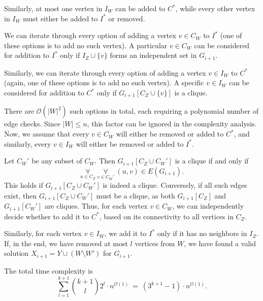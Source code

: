 \documentclass[12pt]{article}
\begin{document}
	\medskip
	
	Similarly, at most one vertex in \(I_{W}\) can be added to \(C^{\ast}\),
	while every other vertex in \(I_{W}\) must either be added to \(I^{\ast}\)
	or removed.
	
	\medskip
	
	We can iterate through every option of adding a vertex \(v \in C_{W}\) to
	\(I^{\ast}\) (one of these options is to add no such vertex). A particular
	\(v \in C_{W}\) can be considered for addition to \(I^{\ast}\) only if
	\(I_{Z} \cup \{v\}\) forms an independent set in \(G_{i + 1}\).
	
	\medskip
	
	Similarly, we can iterate through every option of adding a vertex \(v \in
	I_{W}\) to \(C^{\ast}\) (again, one of these options is to add no such
	vertex). A specific \(v \in I_{W}\) can be considered for addition to
	\(C^{\ast}\) only if \(G_{i + 1}[C_{Z} \cup \{v\}]\) is a clique.
	
	\medskip
	
	There are \(\mathcal{O}(|W|^{2})\) such options in total, each requiring a
	polynomial number of edge checks. Since \(|W| \leqslant n\), this factor can
	be ignored in the complexity analysis. Now, we assume that every \(v \in
	C_{W}\) will either be removed or added to \(C^{\ast}\), and similarly,
	every \(v \in I_{W}\) will either be removed or added to \(I^{\ast}\).
	
	\medskip
	
	Let \(C_{W}'\) be any subset of \(C_{W}\). Then \(G_{i + 1}[C_{Z} \cup
	C_{W}']\) is a clique if and only if
	\[ \underset{u \in C_{Z}}{\forall} \ \underset{v \in C_{W}'}{\forall} \
	(u, v) \in E(G_{i + 1}) \text{.} \]
	This holds if \(G_{i + 1}[C_{Z} \cup C_{W}']\) is indeed a clique.
	Conversely, if all such edges exist, then \(G_{i + 1}[C_{Z} \cup C_{W}']\)
	must be a clique, as both \(G_{i + 1}[C_{Z}]\) and \(G_{i + 1}[C_{W}']\) are
	cliques. Thus, for each vertex \(v \in C_{W}\), we can independently decide
	whether to add it to \(C^{\ast}\), based on its connectivity to all vertices
	in \(C_{Z}\).
	
	\medskip
	
	Similarly, for each vertex \(v \in I_{W}\), we add it to \(I^{\ast}\) only
	if it has no neighbors in \(I_{Z}\). If, in the end, we have removed at most
	\(l\) vertices from \(W\), we have found a valid solution \(X_{i + 1} = Y
	\cup (W \setminus W')\) for \(G_{i + 1}\).
	
	\medskip
	
	The total time complexity is
	\[ \sum_{l = 1}^{k + 1} \binom{k + 1}{l} 2^{l} \cdot n^{\mathcal{O}(1)} \ =
	\ \left( 3^{k + 1} - 1 \right) \cdot n^{\mathcal{O}(1)} \text{.} \]
\end{document}
